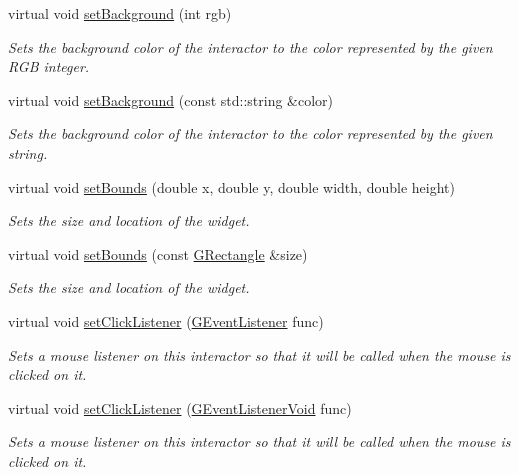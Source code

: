 \begin{DoxyCompactItemize}
virtual void \mbox{\hyperlink{classsgl_1_1GInteractor_acba7e546c2025c0a15ca4b4cc92043db}{set\+Background}} (int rgb)
\begin{DoxyCompactList}\small\item\em Sets the background color of the interactor to the color represented by the given R\+GB integer. \end{DoxyCompactList}\item 
virtual void \mbox{\hyperlink{classsgl_1_1GInteractor_ab4677ab2474e68b07aa56605af92a84a}{set\+Background}} (const std\+::string \&color)
\begin{DoxyCompactList}\small\item\em Sets the background color of the interactor to the color represented by the given string. \end{DoxyCompactList}\item 
virtual void \mbox{\hyperlink{classsgl_1_1GInteractor_a2aae8197624b72265ab83b4f1bc73f2f}{set\+Bounds}} (double x, double y, double width, double height)
\begin{DoxyCompactList}\small\item\em Sets the size and location of the widget. \end{DoxyCompactList}\item 
virtual void \mbox{\hyperlink{classsgl_1_1GInteractor_acada386653f008cacc7cce86426bef7c}{set\+Bounds}} (const \mbox{\hyperlink{structsgl_1_1GRectangle}{G\+Rectangle}} \&size)
\begin{DoxyCompactList}\small\item\em Sets the size and location of the widget. \end{DoxyCompactList}\item 
virtual void \mbox{\hyperlink{classsgl_1_1GInteractor_abd40af6921242584d0954f173911b190}{set\+Click\+Listener}} (\mbox{\hyperlink{namespacesgl_ae9f3e9eab70035da1a2b114e21357b25}{G\+Event\+Listener}} func)
\begin{DoxyCompactList}\small\item\em Sets a mouse listener on this interactor so that it will be called when the mouse is clicked on it. \end{DoxyCompactList}\item 
virtual void \mbox{\hyperlink{classsgl_1_1GInteractor_a856414c92df90f56f3877475eb3f8fc4}{set\+Click\+Listener}} (\mbox{\hyperlink{namespacesgl_a54427ce97bb1c2804e4fe2b0a62e8b17}{G\+Event\+Listener\+Void}} func)
\begin{DoxyCompactList}\small\item\em Sets a mouse listener on this interactor so that it will be called when the mouse is clicked on it. \end{DoxyCompactList}\item 

\end{DoxyCompactItemize}
